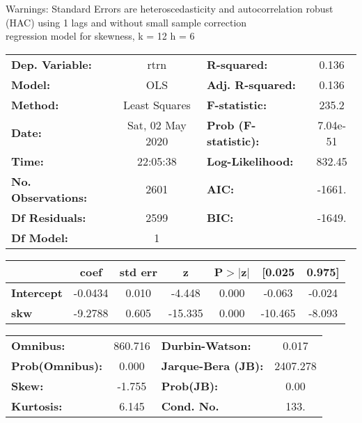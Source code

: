Warnings: \newline
 [1] Standard Errors are heteroscedasticity and autocorrelation robust (HAC) using 1 lags and without small sample correction\\ 

regression model for skewness, k = 12 h = 6\begin{center}
\begin{tabular}{lclc}
\toprule
\textbf{Dep. Variable:}    &       rtrn       & \textbf{  R-squared:         } &     0.136   \\
\textbf{Model:}            &       OLS        & \textbf{  Adj. R-squared:    } &     0.136   \\
\textbf{Method:}           &  Least Squares   & \textbf{  F-statistic:       } &     235.2   \\
\textbf{Date:}             & Sat, 02 May 2020 & \textbf{  Prob (F-statistic):} &  7.04e-51   \\
\textbf{Time:}             &     22:05:38     & \textbf{  Log-Likelihood:    } &    832.45   \\
\textbf{No. Observations:} &        2601      & \textbf{  AIC:               } &    -1661.   \\
\textbf{Df Residuals:}     &        2599      & \textbf{  BIC:               } &    -1649.   \\
\textbf{Df Model:}         &           1      & \textbf{                     } &             \\
\bottomrule
\end{tabular}
\begin{tabular}{lcccccc}
                   & \textbf{coef} & \textbf{std err} & \textbf{z} & \textbf{P$> |$z$|$} & \textbf{[0.025} & \textbf{0.975]}  \\
\midrule
\textbf{Intercept} &      -0.0434  &        0.010     &    -4.448  &         0.000        &       -0.063    &       -0.024     \\
\textbf{skw}       &      -9.2788  &        0.605     &   -15.335  &         0.000        &      -10.465    &       -8.093     \\
\bottomrule
\end{tabular}
\begin{tabular}{lclc}
\textbf{Omnibus:}       & 860.716 & \textbf{  Durbin-Watson:     } &    0.017  \\
\textbf{Prob(Omnibus):} &   0.000 & \textbf{  Jarque-Bera (JB):  } & 2407.278  \\
\textbf{Skew:}          &  -1.755 & \textbf{  Prob(JB):          } &     0.00  \\
\textbf{Kurtosis:}      &   6.145 & \textbf{  Cond. No.          } &     133.  \\
\bottomrule
\end{tabular}
\end{center}


